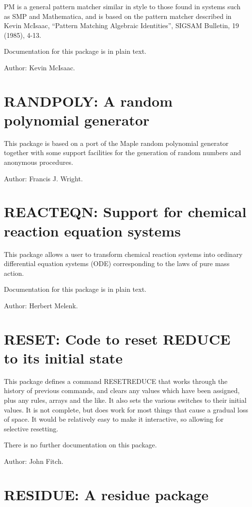 PM is a general pattern matcher similar in style to those found in systems
such as SMP and Mathematica, and is based on the pattern matcher described
in Kevin McIsaac, ``Pattern Matching Algebraic Identities'', SIGSAM Bulletin,
19 (1985), 4-13.

Documentation for this package is in plain text.

Author: Kevin McIsaac.

\section{RANDPOLY: A random polynomial generator} 

This package is based on a port of the Maple random polynomial
generator together with some support facilities for the generation
of random numbers and anonymous procedures.

Author: Francis J. Wright.

\section{REACTEQN: Support for chemical reaction equation systems}

This package allows a user to transform chemical reaction systems into
ordinary differential equation systems (ODE) corresponding to the laws of
pure mass action.

Documentation for this package is in plain text.

Author: Herbert Melenk.

\section{RESET: Code to reset REDUCE to its initial state} 

This package defines a command RESETREDUCE that works through the
history of previous commands, and clears any values which have been
assigned, plus any rules, arrays and the like.  It also sets the various
switches to their initial values.  It is not complete, but does work for
most things that cause a gradual loss of space.  It would be relatively
easy to make it interactive, so allowing for selective resetting.

There is no further documentation on this package.

Author: John Fitch.

\section{RESIDUE: A residue package} 

